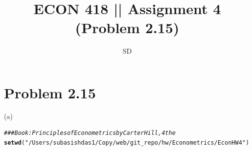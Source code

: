 \documentclass[a4paper]{article}\usepackage[]{graphicx}\usepackage[]{color}
\makeatletter
\newcommand{\hlstr}[1]{\textcolor[rgb]{0.192,0.494,0.8}{#1}}%
\newcommand{\hlcom}[1]{\textcolor[rgb]{0.678,0.584,0.686}{\textit{#1}}}%
\newcommand{\hlstd}[1]{\textcolor[rgb]{0.345,0.345,0.345}{#1}}%
\newcommand{\hlkwd}[1]{\textcolor[rgb]{0.737,0.353,0.396}{\textbf{#1}}}%
\newenvironment{kframe}{%
 \def\at@end@of@kframe{}%
 \ifinner\ifhmode%
  \def\at@end@of@kframe{\end{minipage}}%
  \begin{minipage}{\columnwidth}%
 \fi\fi%
 \def\FrameCommand##1{\hskip\@totalleftmargin \hskip-\fboxsep
 \colorbox{shadecolor}{##1}\hskip-\fboxsep
     \hskip-\linewidth \hskip-\@totalleftmargin \hskip\columnwidth}%
 \MakeFramed {\advance\hsize-\width
   \@totalleftmargin\z@ \linewidth\hsize
   \@setminipage}}%
 {\par\unskip\endMakeFramed%
 \at@end@of@kframe}
\newenvironment{knitrout}{}{} %
\makeatother
\begin{document}
\title{ECON 418 || Assignment 4 (Problem 2.15)}
\author{SD}
\maketitle

\section{ Problem 2.15}

(a)

\begin{knitrout}
\color{fgcolor}\begin{kframe}
\begin{alltt}
\hlcom{### Book: Principles of Econometrics by Carter Hill, 4th e}
\hlkwd{setwd}\hlstd{(}\hlstr{"/Users/subasishdas1/Copy/web/git_repo/hw/Econometrics/Econ HW 4"}\hlstd{)}
\end{alltt}



\end{kframe}
\end{knitrout}
\end{document}
